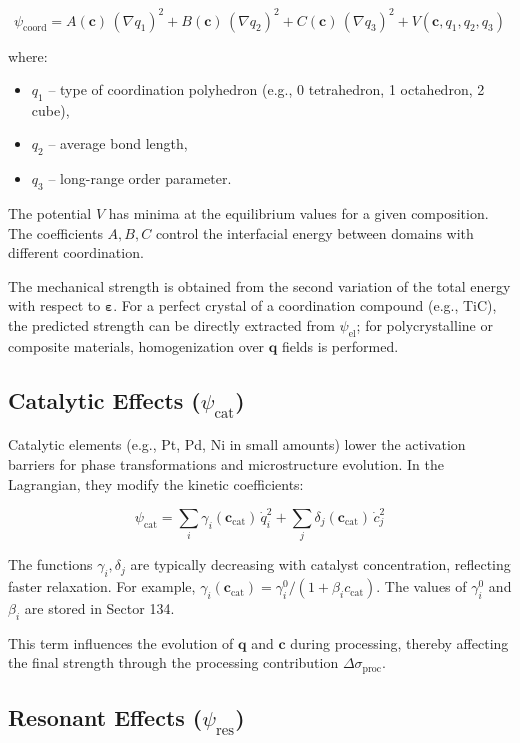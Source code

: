 \documentclass[12pt,a4paper]{article}
\begin{document}
	\[
	\psi_{\mathrm{coord}} = A(\mathbf{c})\,(\nabla q_1)^2 + B(\mathbf{c})\,(\nabla q_2)^2 + C(\mathbf{c})\,(\nabla q_3)^2 + V(\mathbf{c}, q_1, q_2, q_3)
	\]
	
	where:
	\begin{itemize}
		\item \(q_1\) – type of coordination polyhedron (e.g., 0 tetrahedron, 1 octahedron, 2 cube),
		\item \(q_2\) – average bond length,
		\item \(q_3\) – long-range order parameter.
	\end{itemize}
	
	The potential \(V\) has minima at the equilibrium values for a given composition. The coefficients \(A,B,C\) control the interfacial energy between domains with different coordination.
	
	The mechanical strength is obtained from the second variation of the total energy with respect to \(\boldsymbol{\varepsilon}\). For a perfect crystal of a coordination compound (e.g., TiC), the predicted strength can be directly extracted from \(\psi_{\mathrm{el}}\); for polycrystalline or composite materials, homogenization over \(\mathbf{q}\) fields is performed.
	
	\subsection{Catalytic Effects (\(\psi_{\mathrm{cat}}\))}
	\label{subsec:catalysis}
	
	Catalytic elements (e.g., Pt, Pd, Ni in small amounts) lower the activation barriers for phase transformations and microstructure evolution. In the Lagrangian, they modify the kinetic coefficients:
	
	\[
	\psi_{\mathrm{cat}} = \sum_i \gamma_i(\mathbf{c}_{\mathrm{cat}})\, \dot{q}_i^2 + \sum_j \delta_j(\mathbf{c}_{\mathrm{cat}})\, \dot{c}_j^2
	\]
	
	The functions \(\gamma_i, \delta_j\) are typically decreasing with catalyst concentration, reflecting faster relaxation. For example, \(\gamma_i(\mathbf{c}_{\mathrm{cat}}) = \gamma_i^0 / (1 + \beta_i c_{\mathrm{cat}})\). The values of \(\gamma_i^0\) and \(\beta_i\) are stored in Sector 134.
	
	This term influences the evolution of \(\mathbf{q}\) and \(\mathbf{c}\) during processing, thereby affecting the final strength through the processing contribution \(\Delta\sigma_{\mathrm{proc}}\).
	
	\subsection{Resonant Effects (\(\psi_{\mathrm{res}}\))}
	\label{subsec:resonance}
	
\end{document}
